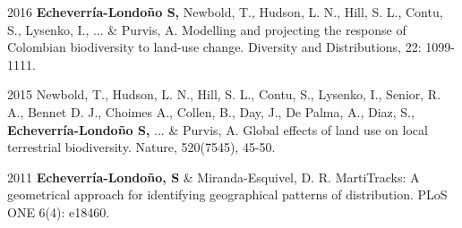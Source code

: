 \documentclass[letterpaper]{twentysecondcv} %
\begin{document}
2016 \textbf{Echeverr\'ia-Londo\~no S,} Newbold, T., Hudson, L. N., Hill, S. L., Contu, S., Lysenko, I., ... \& Purvis, A. Modelling and projecting the response of Colombian biodiversity to land-use change. Diversity and Distributions, 22: 1099-1111.

2015 Newbold, T., Hudson, L. N., Hill, S. L., Contu, S., Lysenko, I., Senior, R. A., Bennet D. J., Choimes A., Collen, B., Day, J., De Palma, A., Diaz, S., \textbf{Echeverr\'ia-Londo\~no S,} ... \& Purvis, A. Global effects of land use on local terrestrial biodiversity. Nature, 520(7545), 45-50.

2011 \textbf{Echeverr\'ia-Londo\~no, S }\& Miranda-Esquivel, D. R. MartiTracks: A geometrical approach for identifying geographical patterns of distribution. PLoS ONE 6(4): e18460.
\end{document}
